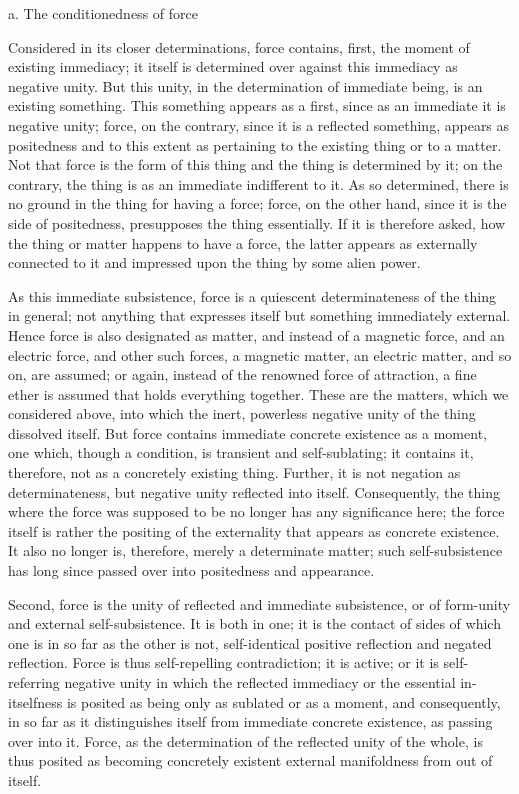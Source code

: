 a. The conditionedness of force

Considered in its closer determinations,
force contains, first, the moment of existing immediacy;
it itself is determined over against this immediacy
as negative unity.
But this unity,
in the determination of immediate being,
is an existing something.
This something appears as a first,
since as an immediate
it is negative unity;
force, on the contrary,
since it is a reflected something,
appears as positedness
and to this extent as pertaining to
the existing thing or to a matter.
Not that force is the form of this thing
and the thing is determined by it;
on the contrary, the thing is as
an immediate indifferent to it.
As so determined, there is no ground in
the thing for having a force;
force, on the other hand,
since it is the side of positedness,
presupposes the thing essentially.
If it is therefore asked,
how the thing or matter happens to have a force,
the latter appears as externally connected to it
and impressed upon the thing by some alien power.

As this immediate subsistence,
force is a quiescent determinateness of
the thing in general;
not anything that expresses itself
but something immediately external.
Hence force is also designated as matter,
and instead of a magnetic force,
and an electric force,
and other such forces,
a magnetic matter,
an electric matter,
and so on, are assumed;
or again, instead of
the renowned force of attraction,
a fine ether is assumed
that holds everything together.
These are the matters,
which we considered above,
into which the inert, powerless
negative unity of the thing dissolved itself.
But force contains immediate
concrete existence as a moment,
one which, though a condition,
is transient and self-sublating;
it contains it, therefore,
not as a concretely existing thing.
Further, it is not negation as determinateness,
but negative unity reflected into itself.
Consequently, the thing where the force was
supposed to be no longer has any significance here;
the force itself is rather
the positing of the externality
that appears as concrete existence.
It also no longer is, therefore,
merely a determinate matter;
such self-subsistence has long since passed over
into positedness and appearance.

Second, force is the unity of
reflected and immediate subsistence,
or of form-unity and external self-subsistence.
It is both in one;
it is the contact of sides of
which one is in so far as the other is not,
self-identical positive reflection and negated reflection.
Force is thus self-repelling contradiction;
it is active;
or it is self-referring negative unity
in which the reflected immediacy
or the essential in-itselfness is
posited as being only as sublated or as a moment,
and consequently, in so far as it distinguishes itself
from immediate concrete existence,
as passing over into it.
Force, as the determination of
the reflected unity of the whole,
is thus posited as  becoming
concretely existent external manifoldness
from out of itself.

